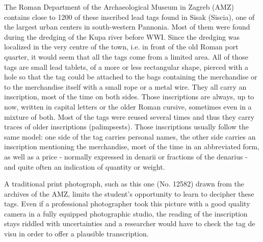 \documentclass[amsthm,ebook]{saparticle}
\begin{document}
\noindent The Roman Department of the Archaeological Museum in Zagreb (AMZ) contains close to 1200 of these inscribed lead tags
found in Sisak (Siscia), one of the largest urban centers in south-western Pannonia. Most of them were found during the
dredging of the Kupa river before WWI. Since the dredging was localized in the very centre of the town, i.e. in front
of the old Roman port quarter, it would seem that all the tags come from a limited area. All of those tags are small
lead tablets, of a more or less rectangular shape, pierced with a hole so that the tag could be attached to the bags
containing the merchandise or to the merchandise itself with a small rope or a metal wire. They all carry an
inscription, most of the time on both sides. Those inscriptions are always, up to now, written in capital letters or
the older Roman cursive, sometimes even in a mixture of both. Most of the tags were reused several times and thus they
carry traces of older inscriptions (palimpsests). Those inscriptions usually follow the same model: one side of the tag
carries personal names, the other side carries an inscription mentioning the merchandise, most of the time in an
abbreviated form, as well as a price - normally expressed in denarii or fractions of the denarius - and quite often an
indication of quantity or weight.

A traditional print photograph, such as this one (No. 12582) drawn from the archives of the AMZ, limits the student’s
opportunity to learn to decipher these tags. Even if a professional photographer took this picture with a good quality
camera in a fully equipped photographic studio, the reading of the inscription stays riddled with uncertainties and a
researcher would have to check the tag de visu in order to offer a plausible transcription.
\end{document}
